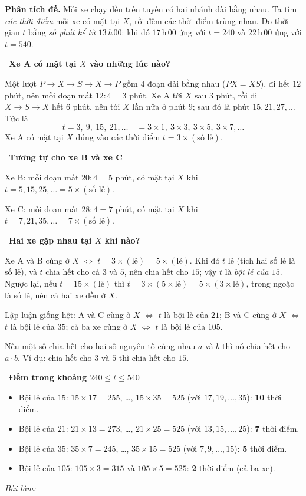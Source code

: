 \documentclass[11pt]{article}
\newif\ifsol \solfalse
\newcommand{\StuProb}[2]{\begin{probboxS}{#1}{#2}\StuProbBody\end{probboxS}}
\newcommand{\probsol}[1]{%
  \begin{lrbox}{\solmeasure}\begin{minipage}{\dimexpr\linewidth-24pt\relax}#1\end{minipage}\end{lrbox}%
  \ifsol
    \begin{solbox}#1\end{solbox}%
  \else
    \setlength{\solht}{\dimexpr\ht\solmeasure+\dp\solmeasure+0.85cm\relax}%
    \ifdim\solht<1.35cm\setlength{\solht}{1.35cm}\fi
    \ifdim\solht>\StudentMaxWork\setlength{\solht}{\StudentMaxWork}\fi
    \par\noindent\begin{minipage}{\linewidth}%
    \expandafter\StuProb\StuProbArgs
    \begin{tcolorbox}[colback=white,colframe=Line,boxrule=0.8pt,arc=5pt,
      left=8pt,right=8pt,top=4pt,bottom=4pt,height=\solht]{\footnotesize\color{Slate}\itshape\WorkWord}\end{tcolorbox}%
    \end{minipage}\par\medskip
  \fi}
\newlength{\StudentMaxWork}\setlength{\StudentMaxWork}{4.5cm}
\newcommand{\step}[2]{\par\smallskip\noindent{\bfseries\color{tmBlue!85!black}\StepWord~#1.}\ {\bfseries #2}\par\nopagebreak}
\def\WorkWord{Bài làm:}
\def\StepWord{Bước}
\begin{document}
\probsol{
\textbf{Phân tích đề.} Mỗi xe chạy đều trên tuyến có hai nhánh dài bằng nhau. Ta tìm \emph{các thời điểm} mỗi xe có mặt tại $X$, rồi đếm các thời điểm trùng nhau. Đo thời gian $t$ bằng \emph{số phút kể từ $13$\,h\,$00$}: khi đó $17$\,h\,$00$ ứng với $t=240$ và $22$\,h\,$00$ ứng với $t=540$.

\step{1}{Xe A có mặt tại $X$ vào những lúc nào?}
Một lượt $P\to X\to S\to X\to P$ gồm $4$ đoạn dài bằng nhau ($PX=XS$), đi hết $12$ phút, nên mỗi đoạn mất $12:4=3$ phút. Xe A tới $X$ sau $3$ phút, rồi đi $X\to S\to X$ hết $6$ phút, nên tới $X$ lần nữa ở phút $9$; sau đó là phút $15, 21, 27,\dots$ Tức là
\[ t=3,\ 9,\ 15,\ 21,\dots \quad = 3\times 1,\ 3\times 3,\ 3\times 5,\ 3\times 7,\dots \]
Xe A có mặt tại $X$ đúng vào các thời điểm $t=3\times(\text{số lẻ})$.

\step{2}{Tương tự cho xe B và xe C}
Xe B: mỗi đoạn mất $20:4=5$ phút, có mặt tại $X$ khi $t=5,15,25,\dots=5\times(\text{số lẻ})$.\par
Xe C: mỗi đoạn mất $28:4=7$ phút, có mặt tại $X$ khi $t=7,21,35,\dots=7\times(\text{số lẻ})$.

\step{3}{Hai xe gặp nhau tại $X$ khi nào?}
\begin{proofbox}Xe A và B cùng ở $X$ $\iff$ $t=3\times(\text{lẻ})=5\times(\text{lẻ})$. Khi đó $t$ lẻ (tích hai số lẻ là số lẻ), và $t$ chia hết cho cả $3$ và $5$, nên chia hết cho $15$; vậy $t$ là \emph{bội lẻ của $15$}. Ngược lại, nếu $t=15\times(\text{lẻ})$ thì $t=3\times(5\times\text{lẻ})=5\times(3\times\text{lẻ})$, trong ngoặc là số lẻ, nên cả hai xe đều ở $X$.\end{proofbox}
Lập luận giống hệt: A và C cùng ở $X$ $\iff$ $t$ là bội lẻ của $21$; B và C cùng ở $X$ $\iff$ $t$ là bội lẻ của $35$; cả ba xe cùng ở $X$ $\iff$ $t$ là bội lẻ của $105$.
\begin{recallbox}Nếu một số chia hết cho hai số nguyên tố cùng nhau $a$ và $b$ thì nó chia hết cho $a\cdot b$. Ví dụ: chia hết cho $3$ và $5$ thì chia hết cho $15$.\end{recallbox}

\step{4}{Đếm trong khoảng $240\le t\le 540$}
\begin{itemize}[leftmargin=1.3em,itemsep=1pt]
\item Bội lẻ của $15$: $15\times 17=255$, \dots, $15\times 35=525$ (với $17,19,\dots,35$): \textbf{10} thời điểm.
\item Bội lẻ của $21$: $21\times 13=273$, \dots, $21\times 25=525$ (với $13,15,\dots,25$): \textbf{7} thời điểm.
\item Bội lẻ của $35$: $35\times 7=245$, \dots, $35\times 15=525$ (với $7,9,\dots,15$): \textbf{5} thời điểm.
\item Bội lẻ của $105$: $105\times 3=315$ và $105\times 5=525$: \textbf{2} thời điểm (cả ba xe).
\end{itemize}

}
\end{document}
